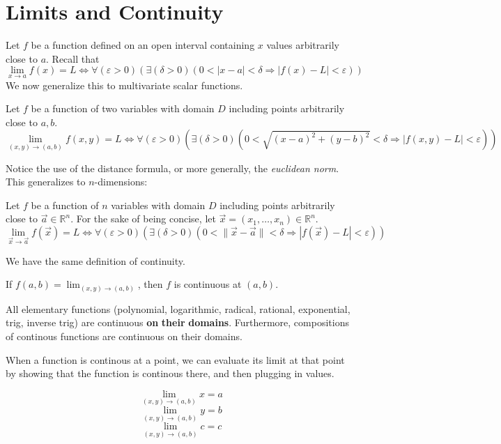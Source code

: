 \section{Limits and Continuity}
Let \(f\) be a function defined on an open interval containing \(x\) values arbitrarily close to \(a\). Recall that
\[
    \lim_{x\to a}f(x)=L\Longleftrightarrow \forall (\varepsilon >0)(\exists (\delta >0)(0<|x-a|<\delta \Longrightarrow |f(x)-L|<\varepsilon ))
\]
We now generalize this to multivariate scalar functions.
\begin{definition}
    Let \(f\) be a function of two variables with domain \(D\) including points arbitrarily close to \(a,b\).
    \[
        \lim_{(x,y)\to (a,b)}f(x,y)=L\Longleftrightarrow \forall (\varepsilon >0)(\exists (\delta >0)(0<\sqrt{(x-a)^2 +(y-b)^2 }<\delta \Longrightarrow  |f(x,y)-L|<\varepsilon ))
    \]
\end{definition}
Notice the use of the distance formula, or more generally, the \emph{euclidean norm}. This generalizes to \(n\)-dimensions:
\begin{definition}
    Let \(f\) be a function of \(n\) variables with domain \(D\) including points arbitrarily close to \(\vec{a}  \in\mathbb{R} ^n\). For the sake of being concise, let \(\vec{x}   =(x_1,\ldots,x_n)\in\mathbb{R} ^n\).
    \[
        \lim_{\vec{x} \to \vec{a}  }f(\vec{x}   )=L\Longleftrightarrow \forall (\varepsilon >0)(\exists (\delta >0)(0<\|\vec{x}   -\vec{a} \|<\delta \Longrightarrow |f(\vec{x}  )-L|<\varepsilon ))
    \]
\end{definition}
We have the same definition of continuity. 
\begin{definition}
    If \(f(a,b)=\lim_{(x,y) \to (a,b)} \), then \(f\) is continuous at \((a,b)\).
\end{definition}
\begin{theorem}
    All elementary functions (polynomial, logarithmic, radical, rational, exponential, trig, inverse trig) are continuous \textbf{on}  \textbf{their}  \textbf{domains}. Furthermore, compositions of continous functions are continuous on their domains.
\end{theorem}
When a function is continous at a point, we can evaluate its limit at that point by showing that the function is continous there, and then plugging in values. 
\begin{theorem}
    \[
        \lim_{(x,y)\to (a,b)}x=a
    \]
    \[
        \lim_{(x,y)\to (a,b)}y=b
    \]
    \[
        \lim_{(x,y)\to (a,b)}c=c
    \]
\end{theorem}
